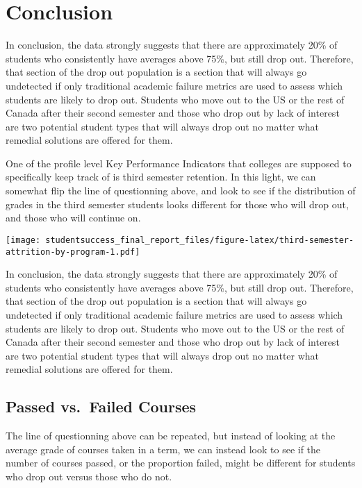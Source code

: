 \documentclass[]{book}
\theoremstyle{definition}
\theoremstyle{definition}
\theoremstyle{remark}
\begin{document}
\hypertarget{conclusion}{\section{Conclusion}\label{conclusion}}

In conclusion, the data strongly suggests that there are approximately
20\% of students who consistently have averages above 75\%, but still
drop out. Therefore, that section of the drop out population is a
section that will always go undetected if only traditional academic
failure metrics are used to assess which students are likely to drop
out. Students who move out to the US or the rest of Canada after their
second semester and those who drop out by lack of interest are two
potential student types that will always drop out no matter what
remedial solutions are offered for them.

One of the profile level Key Performance Indicators that colleges are
supposed to specifically keep track of is third semester retention. In
this light, we can somewhat flip the line of questionning above, and
look to see if the distribution of grades in the third semester students
looks different for those who will drop out, and those who will continue
on.

\texttt{[image: studentsuccess\_final\_report\_files/figure-latex/third-semester-attrition-by-program-1.pdf]}

In conclusion, the data strongly suggests that there are approximately
20\% of students who consistently have averages above 75\%, but still
drop out. Therefore, that section of the drop out population is a
section that will always go undetected if only traditional academic
failure metrics are used to assess which students are likely to drop
out. Students who move out to the US or the rest of Canada after their
second semester and those who drop out by lack of interest are two
potential student types that will always drop out no matter what
remedial solutions are offered for them.

\subsection{Passed vs.~Failed Courses}\label{passed-vs.failed-courses}

The line of questionning above can be repeated, but instead of looking
at the average grade of courses taken in a term, we can instead look to
see if the number of courses passed, or the proportion failed, might be
different for students who drop out versus those who do not.
\end{document}
